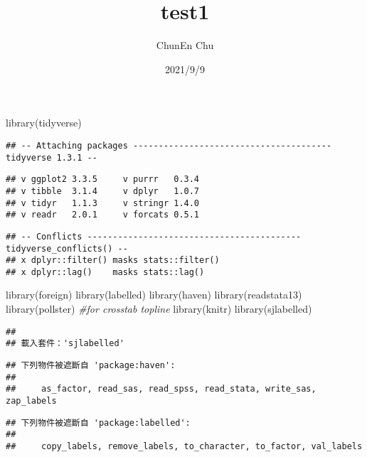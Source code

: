 \documentclass[
]{article}
\title{test1}
\author{ChunEn Chu}
\date{2021/9/9}
\newenvironment{Shaded}{\begin{snugshade}}{\end{snugshade}}
\newcommand{\CommentTok}[1]{\textcolor[rgb]{0.56,0.35,0.01}{\textit{#1}}}
\newcommand{\FunctionTok}[1]{\textcolor[rgb]{0.00,0.00,0.00}{#1}}
\newcommand{\NormalTok}[1]{#1}
\begin{document}
\maketitle

\begin{Shaded}
\begin{Highlighting}[]
\FunctionTok{library}\NormalTok{(tidyverse)}
\end{Highlighting}
\end{Shaded}

\begin{verbatim}
## -- Attaching packages --------------------------------------- tidyverse 1.3.1 --
\end{verbatim}

\begin{verbatim}
## v ggplot2 3.3.5     v purrr   0.3.4
## v tibble  3.1.4     v dplyr   1.0.7
## v tidyr   1.1.3     v stringr 1.4.0
## v readr   2.0.1     v forcats 0.5.1
\end{verbatim}

\begin{verbatim}
## -- Conflicts ------------------------------------------ tidyverse_conflicts() --
## x dplyr::filter() masks stats::filter()
## x dplyr::lag()    masks stats::lag()
\end{verbatim}

\begin{Shaded}
\begin{Highlighting}[]
\FunctionTok{library}\NormalTok{(foreign)}
\FunctionTok{library}\NormalTok{(labelled)}
\FunctionTok{library}\NormalTok{(haven)}
\FunctionTok{library}\NormalTok{(readstata13)}
\FunctionTok{library}\NormalTok{(pollster)}
\CommentTok{\#for crosstab topline}
\FunctionTok{library}\NormalTok{(knitr)}
\FunctionTok{library}\NormalTok{(sjlabelled)}
\end{Highlighting}
\end{Shaded}

\begin{verbatim}
## 
## 載入套件：'sjlabelled'
\end{verbatim}

\begin{verbatim}
## 下列物件被遮斷自 'package:haven':
## 
##     as_factor, read_sas, read_spss, read_stata, write_sas, zap_labels
\end{verbatim}

\begin{verbatim}
## 下列物件被遮斷自 'package:labelled':
## 
##     copy_labels, remove_labels, to_character, to_factor, val_labels
\end{verbatim}
\end{document}
